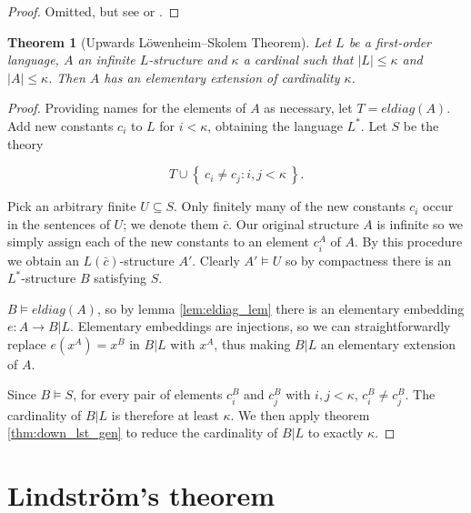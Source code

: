 \documentclass[10pt, a4paper, oneside]{article}
\newtheorem{thm}{Theorem}[section]
\theoremstyle{definition}
\theoremstyle{remark}
\theoremstyle{plain}
\theoremstyle{plain}
\begin{document}
\begin{proof}
    Omitted, but see \citet[pp. 69--72]{hodges1997} or
    \citet[p. 124]{vdalen2004}.
\end{proof}

\begin{thm}[Upwards Löwenheim--Skolem Theorem]
    \label{thm:up_lst_gen}
    Let $L$ be a first-order language, $A$ an infinite $L$-structure and
    $\kappa$ a cardinal such that $|L| \leq \kappa$ and $|A| \leq \kappa$. Then
    $A$ has an elementary extension of cardinality $\kappa$.
\end{thm}

\begin{proof}
    Providing names for the elements of $A$ as necessary, let $T = eldiag(A)$.
    Add new constants $c_i$ to $L$ for $i < \kappa$, obtaining the language
    $L^*$. Let $S$ be the theory
    
    \begin{displaymath}
        T \cup \left\{\ c_i \neq c_j : i, j < \kappa\ \right\}.
    \end{displaymath}
    
    Pick an arbitrary finite $U \subseteq S$. Only finitely many of the new
    constants $c_i$ occur in the sentences of $U$; we denote them $\bar{c}$. Our
    original structure $A$ is infinite so we simply assign each of the new
    constants to an element $c^A_i$ of $A$. By this procedure we obtain an
    $L(\bar{c})$-structure $A'$. Clearly $A' \models U$ so by compactness there
    is an $L^*$-structure $B$ satisfying $S$.
    
    $B \models eldiag(A)$, so by lemma \ref{lem:eldiag_lem} there is an
    elementary embedding $e : A \rightarrow B | L$. Elementary embeddings are
    injections, so we can straightforwardly replace $e(x^A) = x^B$ in $B|L$ with
    $x^A$, thus making $B|L$ an elementary extension of $A$.
    
    Since $B \models S$, for every pair of elements $c^B_i$ and $c^B_j$ with
    $i, j < \kappa$, $c^B_i \neq c^B_j$. The cardinality of $B | L$ is therefore
    at least $\kappa$. We then apply theorem \ref{thm:down_lst_gen} to reduce
    the cardinality of $B|L$ to exactly $\kappa$.
\end{proof}

\section{Lindström's theorem}
\end{document}
